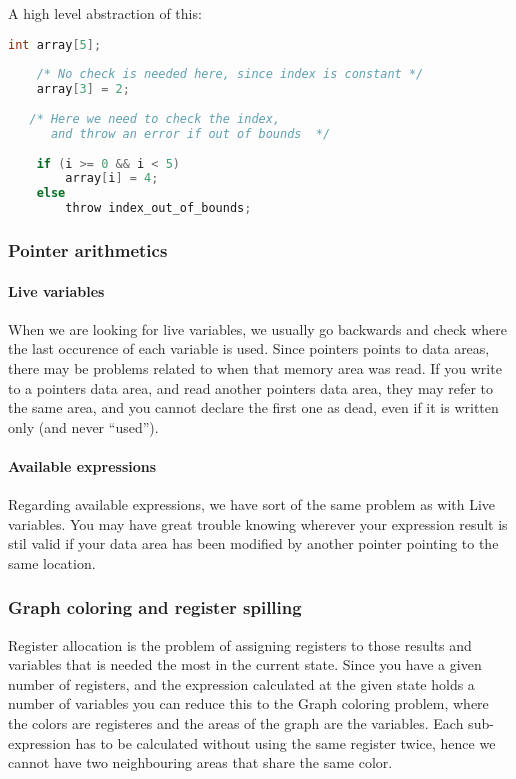 \documentclass[english,a4paper]{scrartcl}
\begin{document}
A high level abstraction of this:
\begin{lstlisting}[language=C]
    int array[5];
    
    /* No check is needed here, since index is constant */
    array[3] = 2;
    
   /* Here we need to check the index,
      and throw an error if out of bounds  */
   
    if (i >= 0 && i < 5)
        array[i] = 4;
    else
        throw index_out_of_bounds;
\end{lstlisting}

\subsubsection{Pointer arithmetics}
\paragraph{Live variables}
When we are looking for live variables, we usually go backwards and check where
the last occurence of each variable is used. Since pointers points to data
areas, there may be problems related to when that memory area was read. If you
write to a pointers data area, and read another pointers data area, they may
refer to the same area, and you cannot declare the first one as dead, even if
it is written only (and never ``used'').
\paragraph{Available expressions}
Regarding available expressions, we have sort of the same problem as with Live
variables. You may have great trouble knowing wherever your expression result is
stil valid if your data area has been modified by another pointer pointing to
the same location.

\subsubsection{Graph coloring and register spilling}
Register allocation is the problem of assigning registers to those results and
variables that is needed the most in the current state. Since you have a given
number of registers, and the expression calculated at the given state holds a
number of variables you can reduce this to the Graph coloring problem, where the
colors are registeres and the areas of the graph are the variables. Each
sub-expression has to be calculated without using the same register twice, hence
we cannot have two neighbouring areas that share the same color.
\end{document}
